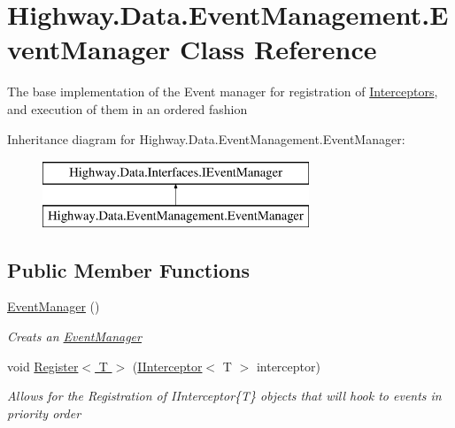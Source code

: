 \hypertarget{class_highway_1_1_data_1_1_event_management_1_1_event_manager}{\section{Highway.\-Data.\-Event\-Management.\-Event\-Manager Class Reference}
\label{class_highway_1_1_data_1_1_event_management_1_1_event_manager}
}


The base implementation of the Event manager for registration of \hyperlink{namespace_highway_1_1_data_1_1_interceptors}{Interceptors}, and execution of them in an ordered fashion  


Inheritance diagram for Highway.\-Data.\-Event\-Management.\-Event\-Manager\-:\begin{figure}[H]
\begin{center}
\leavevmode
\includegraphics[height=2.000000cm]{class_highway_1_1_data_1_1_event_management_1_1_event_manager}
\end{center}
\end{figure}
\subsection*{Public Member Functions}
\begin{DoxyCompactItemize}
\item 
\hyperlink{class_highway_1_1_data_1_1_event_management_1_1_event_manager_a2ff87220e8e54bedff9594688e52163c}{Event\-Manager} ()
\begin{DoxyCompactList}\small\item\em Creats an \hyperlink{class_highway_1_1_data_1_1_event_management_1_1_event_manager}{Event\-Manager} \end{DoxyCompactList}\item 
void \hyperlink{class_highway_1_1_data_1_1_event_management_1_1_event_manager_afef19b17ec8fa17764a1cd24f5569f34}{Register$<$ T $>$} (\hyperlink{interface_highway_1_1_data_1_1_interfaces_1_1_i_interceptor-g}{I\-Interceptor}$<$ T $>$ interceptor)
\begin{DoxyCompactList}\small\item\em Allows for the Registration of I\-Interceptor\{\-T\} objects that will hook to events in priority order \end{DoxyCompactList}\end{DoxyCompactItemize}
